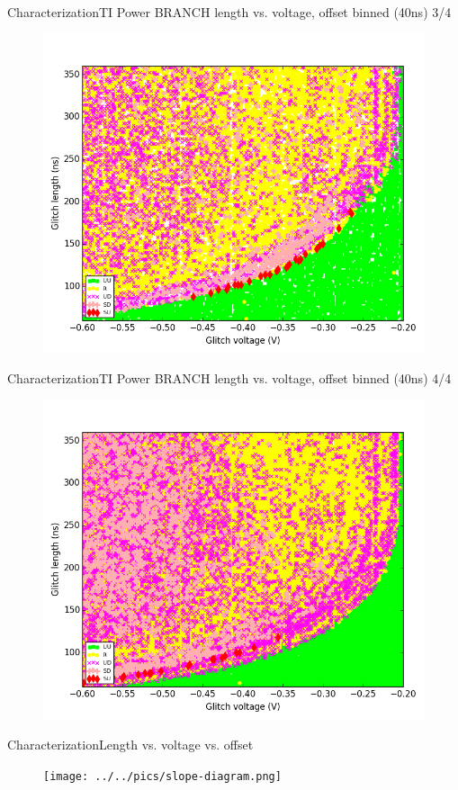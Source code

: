 \documentclass[table]{beamer}
\begin{document}
\begin{frame}{Characterization}{TI Power BRANCH length vs. voltage, offset binned (40ns) 3/4}
    \vspace{-.3cm}
    \begin{figure}[H]
      \centering
      \includegraphics[width=.75\textwidth]{../../plots/newplots/ti-auth-voltage-length-offets-3.png}
    \end{figure}
\end{frame}
\begin{frame}{Characterization}{TI Power BRANCH length vs. voltage, offset binned (40ns) 4/4}
    \vspace{-.3cm}
    \begin{figure}[H]
      \centering
      \includegraphics[width=.75\textwidth]{../../plots/newplots/ti-auth-voltage-length-offets-4.png}
    \end{figure}
\end{frame}

\begin{frame}{Characterization}{Length vs. voltage vs. offset}
    \vspace{-.3cm}
    \begin{figure}[H]
      \centering
      \texttt{[image: ../../pics/slope-diagram.png]}
    \end{figure}
\end{frame}
\end{document}
